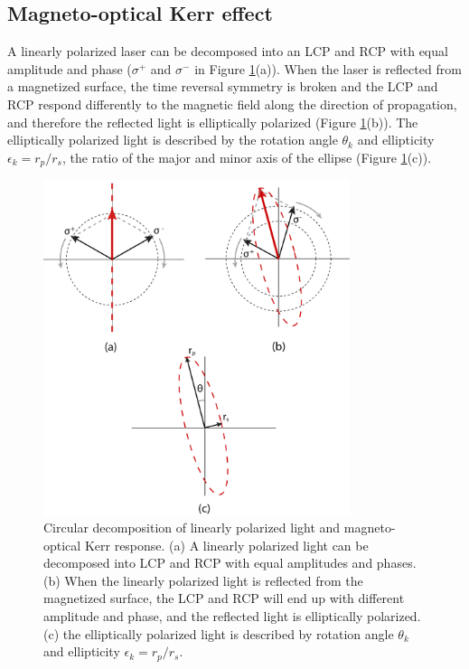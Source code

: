 \documentclass[pdflatex, sectionletters, 12pt]{pittetd}    %
\begin{document}
\subsection{Magneto-optical Kerr effect}

A linearly polarized laser can be decomposed into an LCP and RCP with equal amplitude and phase ($\sigma^+$ and $\sigma^-$ in Figure \ref{FIG:CircularDecompose}(a)). When the laser is reflected from a magnetized surface, the time reversal symmetry is broken and the LCP and RCP respond differently to the magnetic field along the direction of propagation, and therefore the reflected light is elliptically polarized (Figure \ref{FIG:CircularDecompose}(b)). The elliptically polarized light is described by the rotation angle $\theta_k$ and ellipticity $\epsilon_k = r_p/r_s$, the ratio of the major and minor axis of the ellipse (Figure \ref{FIG:CircularDecompose}(c)).
\\

\begin{figure}[p]
	\centering
	\includegraphics[width=0.8\textwidth]{Drawing/CircularDecompose.pdf}
	\caption{Circular decomposition of linearly polarized light and magneto-optical Kerr response. (a) A linearly polarized light can be decomposed into LCP and RCP with equal amplitudes and phases. (b) When the linearly polarized light is reflected from the magnetized surface, the LCP and RCP will end up with different amplitude and phase, and the reflected light is elliptically polarized. (c) the elliptically polarized light is described by rotation angle $\theta_k$ and ellipticity $\epsilon_k = r_p/r_s$.}
	\label{FIG:CircularDecompose}
\end{figure}
\end{document}
